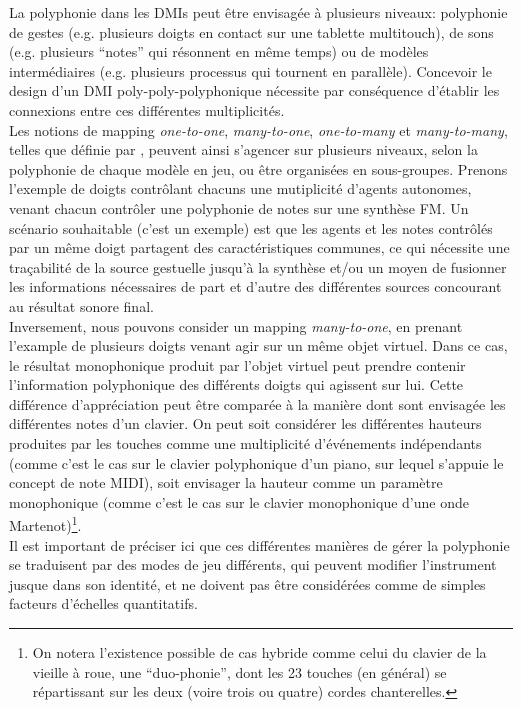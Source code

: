 \noindent La polyphonie dans les \glspl{DMI} peut être envisagée à plusieurs niveaux: polyphonie de gestes (e.g. plusieurs doigts en contact sur une tablette multitouch), de sons (e.g. plusieurs ``notes'' qui résonnent en même temps) ou de modèles intermédiaires (e.g. plusieurs processus qui tournent en parallèle). Concevoir le design d'un \gls{DMI} poly-poly-polyphonique nécessite par conséquence d'établir les connexions entre ces différentes multiplicités.\\
\indent Les notions de mapping \textit{one-to-one}, \textit{many-to-one}, \textit{one-to-many} et \textit{many-to-many}, telles que définie par \cite{hunt_mapping_2002}, peuvent ainsi s'agencer sur plusieurs niveaux, selon la polyphonie de chaque modèle en jeu, ou être organisées en sous-groupes. Prenons l'exemple de doigts contrôlant chacuns une mutiplicité d'agents autonomes, venant chacun contrôler une polyphonie de notes sur une synthèse \gls{FM}. Un scénario souhaitable (c'est un exemple) est que les agents et les notes contrôlés par un même doigt partagent des caractéristiques communes, ce qui nécessite une traçabilité de la source gestuelle jusqu'à la synthèse et/ou un moyen de fusionner les informations nécessaires de part et d'autre des différentes sources concourant au résultat sonore final.\\
\indent Inversement, nous pouvons consider un mapping \textit{many-to-one}, en prenant l'example de plusieurs doigts venant agir sur un même objet virtuel. Dans ce cas, le résultat monophonique produit par l'objet virtuel peut prendre contenir l'information polyphonique des différents doigts qui agissent sur lui. Cette différence d'appréciation peut être comparée à la manière dont sont envisagée les différentes notes d'un clavier. On peut soit considérer les différentes hauteurs produites par les touches comme une multiplicité d'événements indépendants (comme c'est le cas sur le clavier polyphonique d'un piano, sur lequel s'appuie le concept de note \gls{MIDI}), soit envisager la hauteur comme un paramètre monophonique (comme c'est le cas sur le clavier monophonique d'une onde Martenot)\footnote{On notera l'existence possible de cas hybride comme celui du clavier de la vieille à roue, une ``duo-phonie'', dont les 23 touches (en général) se répartissant sur les deux (voire trois ou quatre) cordes chanterelles.}.\\
\indent Il est important de préciser ici que ces différentes manières de gérer la polyphonie se traduisent par des modes de jeu différents, qui peuvent modifier l'instrument jusque dans son identité, et ne doivent pas être considérées comme de simples facteurs d'échelles quantitatifs.

